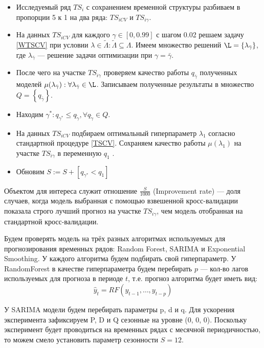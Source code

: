 \documentclass[a4paper, 14pt]{article}
\begin{document}
\begin{itemize} \label{desc: WTSCV}
	\item Исследуемый ряд $TS_i$ с сохранением временной структуры разбиваем в пропорции 5 к 1 на два ряда: $TS_{iCV}$ и $TS_{i\gamma}$.
	\item На данных $TS_{iCV}$ для каждого $\gamma \in \left[0, 0.99\right]$ с шагом 0.02 решаем задачу \eqref{WTSCV} при условии $\lambda \in \tilde{\Lambda} : \tilde{\Lambda} \subseteq \Lambda$. Имеем множество решений $\L = \left\{ \lambda_{\bar{\gamma}} \right\}$, где $\lambda_{\bar{\gamma}}$ --- решение задачи оптимизации при $\gamma = \bar{\gamma}$.
	\item После чего на участке $TS_{i\gamma}$ проверяем качество работы $q_{\bar{\gamma}}$ полученных моделей $\mu(\lambda_{\bar{\gamma}}) : \forall \lambda_{\bar{\gamma}} \in \L$. Записываем полученные результаты в множество $Q = \left\{q_{\bar{\gamma}}\right\}$.
	\item Находим $\gamma^* : q_{\gamma^*} \leq  q_{{\tilde{\gamma}}},   \forall q_{{\tilde{\gamma}}} \in Q$.
	\item На данных $TS_{iCV}$ подбираем оптимальный гиперпараметр $\lambda_{1}$ согласно стандартной процедуре \eqref{TSCV}. Сохраняем качество работы $\mu(\lambda_{1})$ на участке $TS_{i\gamma}$ в переменную $q_1$ .
	\item Обновим $S := S + \left[q_{\gamma^*} < q_1 \right]$
\end{itemize}

Объектом для интереса служит отношение $\frac{S}{1000}$ (Improvement rate) --- доля случаев, когда модель выбранная с помощью взвешенной кросс-валидации показала строго лучший прогноз на участке $TS_{i\gamma}$, чем модель отобранная на стандартной кросс-валидации.

Будем проверять модель на трёх разных алгоритмах используемых для прогнозирования временных рядов: Random Forest, SARIMA и Exponential Smoothing. У каждого алгоритма будем подбирать свой гиперпараметр. У RandomForest в качестве гиперпараметра будем перебирать $p$ --- кол-во лагов используемых для прогноза в периоде $t$, т.е. прогноз алгоритма будет иметь вид: 
\[ \hat y_t = RF(y_{t-1}, \dots , y_{t-p} ) \]

У SARIMA модели будем перебирать параметры p, d и q. Для ускорения эксперимента зафиксируем P, D и Q сезонные на уровне (0, 0, 0). Поскольку эксперимент будет проводиться на временных рядах с месячной периодичностью, то можем смело установить параметр сезонности $S = 12$.
\end{document}
